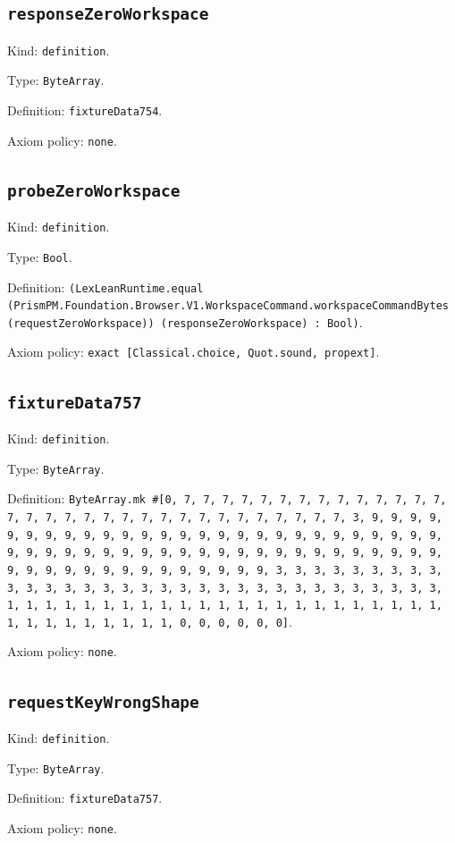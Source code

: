 \documentclass[11pt]{article}
\begin{document}
\subsection*{\texttt{responseZeroWorkspace}}
\noindent Kind: \texttt{definition}.\par
\noindent Type: \texttt{ByteArray}.\par
\noindent Definition: \texttt{fixtureData754}.\par
\noindent Axiom policy: \texttt{none}.\par
\subsection*{\texttt{probeZeroWorkspace}}
\noindent Kind: \texttt{definition}.\par
\noindent Type: \texttt{Bool}.\par
\noindent Definition: \texttt{(LexLeanRuntime.equal (PrismPM.Foundation.Browser.V1.WorkspaceCommand.workspaceCommandBytes (requestZeroWorkspace)) (responseZeroWorkspace) : Bool)}.\par
\noindent Axiom policy: \texttt{exact [Classical.choice, Quot.sound, propext]}.\par
\subsection*{\texttt{fixtureData757}}
\noindent Kind: \texttt{definition}.\par
\noindent Type: \texttt{ByteArray}.\par
\noindent Definition: \texttt{ByteArray.mk \#[0, 7, 7, 7, 7, 7, 7, 7, 7, 7, 7, 7, 7, 7, 7, 7, 7, 7, 7, 7, 7, 7, 7, 7, 7, 7, 7, 7, 7, 7, 7, 7, 7, 3, 9, 9, 9, 9, 9, 9, 9, 9, 9, 9, 9, 9, 9, 9, 9, 9, 9, 9, 9, 9, 9, 9, 9, 9, 9, 9, 9, 9, 9, 9, 9, 9, 9, 9, 9, 9, 9, 9, 9, 9, 9, 9, 9, 9, 9, 9, 9, 9, 9, 9, 9, 9, 9, 9, 9, 9, 9, 9, 9, 9, 9, 9, 9, 9, 3, 3, 3, 3, 3, 3, 3, 3, 3, 3, 3, 3, 3, 3, 3, 3, 3, 3, 3, 3, 3, 3, 3, 3, 3, 3, 3, 3, 3, 3, 3, 3, 1, 1, 1, 1, 1, 1, 1, 1, 1, 1, 1, 1, 1, 1, 1, 1, 1, 1, 1, 1, 1, 1, 1, 1, 1, 1, 1, 1, 1, 1, 1, 1, 0, 0, 0, 0, 0, 0]}.\par
\noindent Axiom policy: \texttt{none}.\par
\subsection*{\texttt{requestKeyWrongShape}}
\noindent Kind: \texttt{definition}.\par
\noindent Type: \texttt{ByteArray}.\par
\noindent Definition: \texttt{fixtureData757}.\par
\noindent Axiom policy: \texttt{none}.\par
\end{document}
